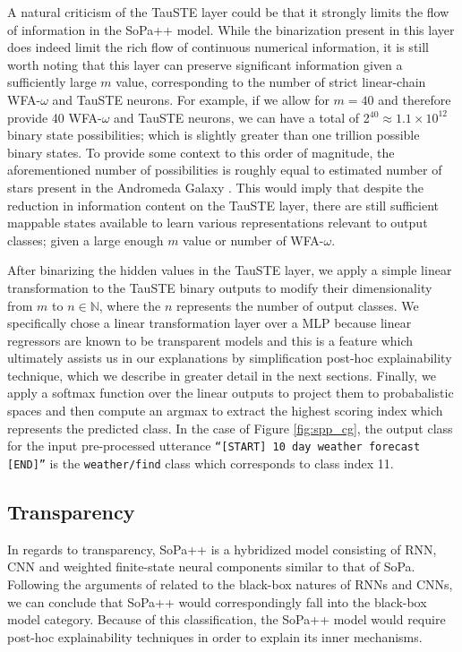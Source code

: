 A natural criticism of the TauSTE layer could be that it strongly limits the
flow of information in the SoPa++ model. While the binarization present in this
layer does indeed limit the rich flow of continuous numerical information, it is
still worth noting that this layer can preserve significant information given a
sufficiently large $m$ value, corresponding to the number of strict linear-chain
WFA-$\omega$ and TauSTE neurons. For example, if we allow for $m=40$ and therefore provide 40
WFA-$\omega$ and TauSTE neurons, we can have a total of
2$^{40}\approx1.1\times10^{12}$ binary state possibilities; which is slightly
greater than one trillion possible binary states. To provide some context to this
order of magnitude, the aforementioned number of possibilities is roughly equal
to estimated number of stars present in the Andromeda Galaxy
\citep{10.1093/mnras/stu879}. This would imply that despite the reduction in
information content on the TauSTE layer, there are still sufficient mappable
states available to learn various representations relevant to output classes;
given a large enough $m$ value or number of WFA-$\omega$.

After binarizing the hidden values in the TauSTE layer, we apply a simple linear
transformation to the TauSTE binary outputs to modify their dimensionality from
$m$ to $n \in \mathbb{N}$, where the $n$ represents the number of output
classes. We specifically chose a linear transformation layer over a MLP because
linear regressors are known to be transparent models
\citep{arrieta2020explainable} and this is a feature which ultimately assists us
in our explanations by simplification post-hoc explainability technique, which
we describe in greater detail in the next sections. Finally, we apply a softmax
function over the linear outputs to project them to probabalistic spaces and
then compute an argmax to extract the highest scoring index which represents the
predicted class. In the case of Figure \ref{fig:spp_cg}, the output class for
the input pre-processed utterance \texttt{``[START] 10 day weather forecast
  [END]''} is the \texttt{weather/find} class which corresponds to class index 11.

\subsection{Transparency}

\label{section:spp_transparency}

In regards to transparency, SoPa++ is a hybridized model consisting of RNN, CNN
and weighted finite-state neural components similar to that of SoPa. Following the
arguments of \citet{arrieta2020explainable} related to the black-box natures of
RNNs and CNNs, we can conclude that SoPa++ would correspondingly fall into the
black-box model category. Because of this classification, the SoPa++ model
would require post-hoc explainability techniques in order to explain its inner
mechanisms.


